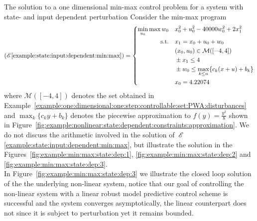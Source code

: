%
\begin{example}{The solution to a one dimensional min-max control problem for a system with state- and input dependent perturbation}\label{example:state:input:dependent:min:max}
Consider the min-max program
\[ 
(\mathscr E\ref{example:state:input:dependent:min:max}) = \left\{\begin{aligned}
\min_{u_0}\max{w_0}&\quad x_0^2+u_0^2 - 40000w_0^2 + 2x_1^2\\
\text{s.t.}&\quad x_1 = x_0+u_0 + w_0\\
&\quad (x_0,u_0)\in\mathcal M([-4,4])\\
&\quad \pm x_1\leq 4\\
&\quad \pm w_0 \leq \max_{k\leq n}\{c_k(x+u)+b_k\}\\
&\quad x_0 = 4.22074
\end{aligned}\right.
\]
%
where $\mathcal M([-4,4])$ denotes the set obtained in Example~\ref{example:one:dimensional:one:step:controllable:set:PWA:disturbances} and $\max_{k}\{c_k y+b_k\}$ denotes the piecewise approximation to $f(y)=\frac{y^3}{8}$ shown in Figure~\ref{fig:example:nonlinear:state:dependent:constraints:approximation}.
%
We do not discuss the arithmetic involved in the solution of~$\mathscr E$\ref{example:state:input:dependent:min:max}, but illustrate the solution in the Figures~\ref{fig:example:min:max:state:dep:1}, \ref{fig:example:min:max:state:dep:2} and \ref{fig:example:min:max:state:dep:3}.
%
\\[1em]
%
In Figure~\ref{fig:example:min:max:state:dep:3} we illustrate the closed loop solution of the the underlying non-linear system, notice that our goal of controlling the non-linear system with a linear robust model predictive control scheme is successful and the system converges asymptotically, the linear counterpart does not since it is subject to perturbation yet it remains bounded.
%
\begin{figure}\centering
{}


\end{figure}
\end{example}
